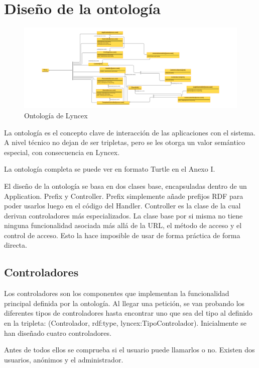 \documentclass[12pt]{report} %
\begin{document}
\section{Diseño de la ontología}

\begin{figure}
    \centering
    \includegraphics[width=\textwidth]{lyncex.png}
    \caption{Ontología de Lyncex}
    \label{fig:ontologia}
\end{figure}

La ontología es el concepto clave de interacción de las aplicaciones con el sistema. A nivel técnico no dejan de ser tripletas, pero se les otorga un valor semántico especial, con consecuencia en Lyncex.

La ontología completa se puede ver en formato Turtle en el Anexo I.

El diseño de la ontología se basa en dos clases base, encapsuladas dentro de un Application. Prefix y Controller. Prefix simplemente añade prefijos RDF para poder usarlos luego en el código del Handler. Controller es la clase de la cual derivan controladores más especializados. La clase base por si misma no tiene ninguna funcionalidad asociada más allá de la URL, el método de acceso y el control de acceso. Esto la hace imposible de usar de forma práctica de forma directa.

\subsection{Controladores}
Los controladores son los componentes que implementan la funcionalidad principal definida por la ontología.
Al llegar una petición, se van probando los diferentes tipos de controladores hasta encontrar uno que sea del tipo al definido en la tripleta: (Controlador, rdf:type, lyncex:TipoControlador).
Inicialmente se han diseñado cuatro controladores.

Antes de todos ellos se comprueba si el usuario puede llamarlos o no. Existen dos usuarios, anónimos y el administrador.
\end{document}
